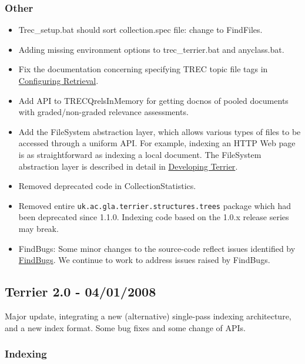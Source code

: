 \subsubsection{Other}\label{other-6}

\begin{itemize}
\tightlist
\item
  Trec\_setup.bat should sort collection.spec file: change to FindFiles.
\item
  Adding missing environment options to trec\_terrier.bat and
  anyclass.bat.
\item
  Fix the documentation concerning specifying TREC topic file tags in
  \href{configure_retrieval.html}{Configuring Retrieval}.
\item
  Add API to TRECQrelsInMemory for getting docnos of pooled documents
  with graded/non-graded relevance assessments.
\item
  Add the FileSystem abstraction layer, which allows various types of
  files to be accessed through a uniform API. For example, indexing an
  HTTP Web page is as straightforward as indexing a local document. The
  FileSystem abstraction layer is described in detail in
  \href{terrier_develop.html}{Developing Terrier}.
\item
  Removed deprecated code in CollectionStatistics.
\item
  Removed entire \texttt{uk.ac.gla.terrier.structures.trees} package
  which had been deprecated since 1.1.0. Indexing code based on the
  1.0.x release series may break.
\item
  FindBugs: Some minor changes to the source-code reflect issues
  identified by \href{http://findbugs.sourceforge.net/}{FindBugs}. We
  continue to work to address issues raised by FindBugs.
\end{itemize}

\subsection{Terrier 2.0 - 04/01/2008}\label{terrier-2.0---04012008}

Major update, integrating a new (alternative) single-pass indexing
architecture, and a new index format. Some bug fixes and some change of
APIs.

\subsubsection{Indexing}\label{indexing-7}

